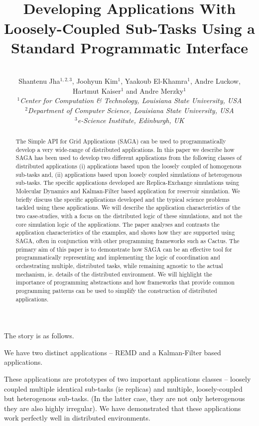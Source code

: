 \documentclass[conference,final]{IEEEtran}
\title{
  ~\\[-3em]
  Developing Applications With Loosely-Coupled Sub-Tasks Using a
  Standard Programmatic Interface}
\author{
    ~\\[-2em]
    Shantenu Jha$^{1,2,3}$, Joohyun Kim$^{1}$,
    Yaakoub El-Khamra$^{1}$, Andre Luckow, \\ 
    Hartmut Kaiser$^{1}$ and Andre Merzky$^{1}$ \\
    \small{\emph{$^{1}$Center for Computation \& Technology, Louisiana State University, USA}}\\
    \small{\emph{$^{2}$Department of Computer Science, Louisiana State
        University, USA}}\\
    \small{\emph{$^{3}$e-Science Institute, Edinburgh, UK}}\\
  }
\begin{document}
 


\maketitle    

\begin{abstract}
  The Simple API for Grid Applications (SAGA) can be used to
  programmatically develop a very wide-range of distributed
  applications.  In this paper we describe how SAGA has been used to
  develop two different applications from the following classes of
  distributed applications (i) applications based upon the loosely
  coupled of homogenous sub-tasks and, (ii) applications based upon
  loosely coupled simulations of heterogenous sub-tasks. The specific
  applications developed are Replica-Exchange simulations using
  Molecular Dynamics and Kalman-Filter based application for reservoir
  simulation.  We briefly discuss the specific applications developed
  and the typical science problems tackled using these applications.
  We will describe the application characteristics of the two
  case-studies, with a focus on the distributed logic of these
  simulations, and not the core simulation logic of the applications.
  The paper analyses and contrasts the application characteristics of
  the examples, and shows how they are supported using SAGA, often in
  conjunction with other programming frameworks such as Cactus.  The
  primary aim of this paper is to demonstrate how SAGA can be an
  effective tool for programmatically representing and implementing the
  logic of coordination and orchestrating multiple, distributed tasks,
  while remaining agnostic to the actual mechanism, ie. details of the
  distributed environment. We will highlight the importance of
  programming abstractions and how frameworks that provide common
  programming patterns can be used to simplify the construction of
  distributed applications.
\end{abstract}


The story is as follows. 

We have two distinct applications -- REMD and a Kalman-Filter based
applications.

These applications are prototypes of two important applications
classes -- loosely coupled multiple identical sub-tasks (ie replicas)
and multiple, loosely-coupled but heterogenous sub-tasks.  (In the
latter case, they are not only heterogenous they are also highly
irregular).  We have demonstrated that these applications work
perfectly well in distributed environments.
\end{document}
